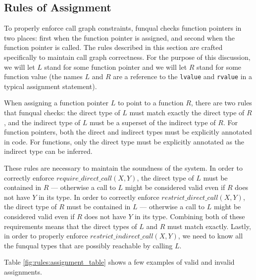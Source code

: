 \subsection{Rules of Assignment}

To properly enforce call graph constraints, funqual checks function pointers in two places:  first when the function pointer is assigned, and second when the function pointer is called.  The rules described in this section are crafted specifically to maintain call graph correctness.  For the purpose of this discussion, we will let $L$ stand for some function pointer and we will let $R$ stand for some function value (the names $L$ and $R$ are a reference to the \lstinline{lvalue} and \lstinline{rvalue} in a typical assignment statement).  

When assigning a function pointer $L$ to point to a function $R$, there are two rules that funqual checks:  the direct type of $L$ must match exactly the direct type of $R$, and the indirect type of $L$ must be a superset of the indirect type of $R$.  For function pointers, both the direct and indirect types must be explicitly annotated in code.  For functions, only the direct type must be explicitly annotated as the indirect type can be inferred.  

These rules are necessary to maintain the soundness of the system.  In order to correctly enforce $require\_direct\_call(X, Y)$, the direct type of $L$ must be contained in $R$ --- otherwise a call to $L$ might be considered valid even if $R$ does not have $Y$ in its type.  In order to correctly enforce $restrict\_direct\_call(X, Y)$, the direct type of $R$ must be contained in $L$ --- otherwise a call to $L$ might be considered valid even if $R$ does not have $Y$ in its type.  Combining both of these requirements means that the direct types of $L$ and $R$ must match exactly.  Lastly, in order to properly enforce $restrict\_indirect\_call(X, Y)$, we need to know all the funqual types that are possibly reachable by calling $L$.  

Table \ref{fig:rules:assignment_table} shows a few examples of valid and invalid assignments.  

